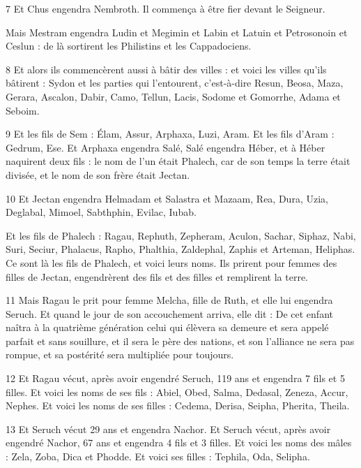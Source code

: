 \par 7 Et Chus engendra Nembroth. Il commença à être fier devant le Seigneur.

\par Mais Mestram engendra Ludin et Megimin et Labin et Latuin et Petrosonoin et Ceslun : de là sortirent les Philistins et les Cappadociens.

\par 8 Et alors ils commencèrent aussi à bâtir des villes : et voici les villes qu'ils bâtirent : Sydon et les parties qui l'entourent, c'est-à-dire Resun, Beosa, Maza, Gerara, Ascalon, Dabir, Camo, Tellun, Lacis, Sodome et Gomorrhe, Adama et Seboim.

\par 9 Et les fils de Sem : Élam, Assur, Arphaxa, Luzi, Aram. Et les fils d'Aram : Gedrum, Ese. Et Arphaxa engendra Salé, Salé engendra Héber, et à Héber naquirent deux fils : le nom de l'un était Phalech, car de son temps la terre était divisée, et le nom de son frère était Jectan.

\par 10 Et Jectan engendra Helmadam et Salastra et Mazaam, Rea, Dura, Uzia, Deglabal, Mimoel, Sabthphin, Evilac, Iubab.

\par Et les fils de Phalech : Ragau, Rephuth, Zepheram, Aculon, Sachar, Siphaz, Nabi, Suri, Seciur, Phalacus, Rapho, Phalthia, Zaldephal, Zaphis et Arteman, Heliphas. Ce sont là les fils de Phalech, et voici leurs noms. Ils prirent pour femmes des filles de Jectan, engendrèrent des fils et des filles et remplirent la terre.

\par 11 Mais Ragau le prit pour femme Melcha, fille de Ruth, et elle lui engendra Seruch. Et quand le jour de son accouchement arriva, elle dit : De cet enfant naîtra à la quatrième génération celui qui élèvera sa demeure et sera appelé parfait et sans souillure, et il sera le père des nations, et son l'alliance ne sera pas rompue, et sa postérité sera multipliée pour toujours.

\par 12 Et Ragau vécut, après avoir engendré Seruch, 119 ans et engendra 7 fils et 5 filles. Et voici les noms de ses fils : Abiel, Obed, Salma, Dedasal, Zeneza, Accur, Nephes. Et voici les noms de ses filles : Cedema, Derisa, Seipha, Pherita, Theila.

\par 13 Et Seruch vécut 29 ans et engendra Nachor. Et Seruch vécut, après avoir engendré Nachor, 67 ans et engendra 4 fils et 3 filles. Et voici les noms des mâles : Zela, Zoba, Dica et Phodde. Et voici ses filles : Tephila, Oda, Selipha.

